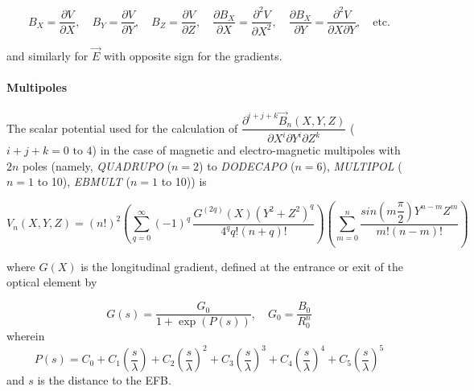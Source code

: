  \begin{equation}
	 	 B_X = \dfrac{\partial V}{\partial X}, 
	 	    \quad B_Y = \dfrac{\partial V }{ \partial Y}, 
	 	     \quad B_Z = \dfrac{\partial V }{ \partial Z}, 
	 	  \quad \dfrac{\partial B_X }{ \partial X} = \dfrac{\partial^2V}{\partial X^2},
	 	     \quad \dfrac{\partial B_X}{\partial Y} 
	 	               = \dfrac{\partial^2V}{\partial X\partial Y},
	 	    \quad\text{etc.}
 	\label{eq2-3-4}
 \end{equation}

\noindent  and similarly for $ \vec  E $ with opposite sign for the gradients. 


\paragraph{Multipoles}

\noindent The scalar potential used for the calculation of 
$ \dfrac{\partial^{i+j+k} \vec B_{n}(X,Y,Z)}{ \partial X^i\partial Y^i\partial 
Z^k}$ ($i+j+k= 0 \text{ to } 4$) in the case of 
 magnetic and electro-magnetic multipoles with $2n$ poles
(namely, \textsl{QUADRUPO} ($n = 2$) to  
\textsl{DODECAPO} ($n=6$),   
\textsl{MULTIPOL} ($n = 1$ to 10), 
\textsl{EBMULT} ($n=1$ to 10))   is~\cite{Biblio5}              %

\begin{equation}
	V_n(X,Y,Z)=(n!)^2 
	  \left( \sum^{ \infty}_{ q=0}(-1)^q \,
	        \dfrac{G^{(2q)}(X)(Y^2+Z^2)^q }{ 4^q q!(n+q)!} \right) 
	  \left( \sum^ n_{m=0}\dfrac{sin \left(m \dfrac{\pi }{ 2} \right) Y^{n-m} Z^m }{ m!(n-m)!} \right) 
	\label{eq2-3-5}
\end{equation}

 where $ G(X) $ is the longitudinal gradient, defined at the entrance 
 or exit of the optical element by

 \begin{equation}
	 G(s) = \dfrac{G_0 }{ 1+ \exp(P(s))} , \quad G_0 = \dfrac{B_0 }{R^n_0} 
 	\label{eq2-3-6}
 \end{equation}
wherein 
$$ P(s) = C_0
	       +C_1 \left(  \dfrac{s }{ \lambda} \right) 
	       +C_2 \left( \dfrac{s }{ \lambda} \right)^2 
	       + C_3 \left( \dfrac{s }{ \lambda} \right)^3 
	       +C_4 \left( \dfrac{s }{ \lambda} \right)^4 
	       + C_5 \left(\dfrac{s }{ \lambda} \right)^5 $$ 
and $s$ is the distance to the EFB.
 
